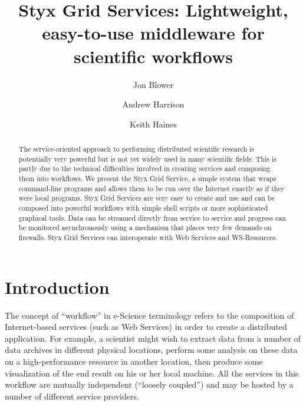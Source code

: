 \documentclass{llncs}
\begin{document}
%
\title{Styx Grid Services: Lightweight, easy-to-use middleware for scientific workflows}
%
%
\author{Jon Blower \and Andrew Harrison \and Keith Haines}
%
%
%

\maketitle              %

\begin{abstract}
The service-oriented approach to performing distributed scientific research is potentially very powerful but is not yet widely used in many scientific fields.  This is partly due to the technical difficulties involved in creating services and composing them into workflows.  We present the Styx Grid Service, a simple system that wraps command-line programs and allows them to be run over the Internet exactly as if they were local programs.  Styx Grid Services are very easy to create and use and can be composed into powerful workflows with simple shell scripts or more sophisticated graphical tools.  Data can be streamed directly from service to service and progress can be monitored asynchronously using a mechanism that places very few demands on firewalls.  Styx Grid Services can interoperate with Web Services and WS-Resources.
\end{abstract}
%
\section{Introduction}\label{sec:intro}

The concept of ``workflow'' in e-Science terminology refers to the composition of Internet-based services (such as Web Services) in order to create a distributed application.  For example, a scientist might wish to extract data from a number of data archives in different physical locations, perform some analysis on these data on a high-performance resource in another location, then produce some visualization of the end result on his or her local machine.  All the services in this workflow are mutually independent (``loosely coupled'') and may be hosted by a number of different service providers.
\end{document}
